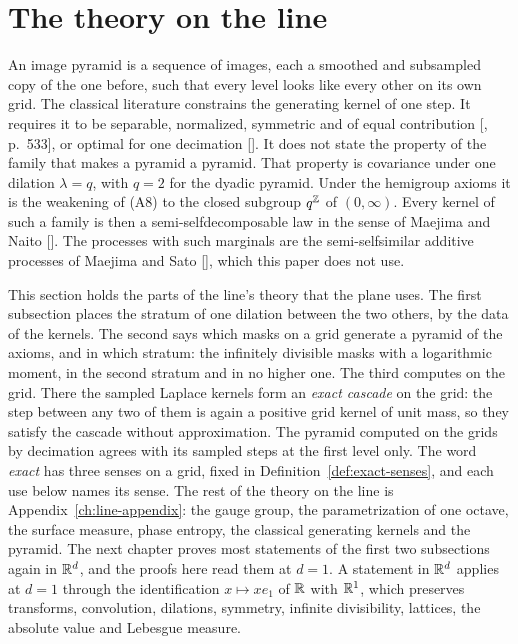 \section{The theory on the line}
\label{sec:line-theory}

An image pyramid is a sequence of images, each a smoothed and subsampled copy of the one before,
such that every level looks like every other on its own grid. The classical literature
constrains the generating kernel of one step. It requires it to be separable, normalized, symmetric
and of equal contribution [, p.~533], or optimal for one decimation
[]. It does not state the property of the family that makes a pyramid a
pyramid. That property is covariance under one dilation $\lambda = q$, with $q = 2$ for the
dyadic pyramid. Under the hemigroup axioms it is the weakening of (A8) to the closed subgroup
$q^{\mathbb{Z}}$ of $(0,\infty)$. Every kernel of such a family is then a semi-selfdecomposable law in
the sense of Maejima and Naito []. The processes with such marginals are
the semi-selfsimilar additive processes of Maejima and Sato [], which this
paper does not use.

This section holds the parts of the line's theory that the plane uses. The first subsection
places the stratum of one dilation between the two others, by the \Levy{} data of the kernels.
The second says which masks on a grid generate a pyramid of the axioms, and in which stratum:
the infinitely divisible masks with a logarithmic moment, in the second stratum and in no
higher one. The third computes on the grid. There the sampled Laplace kernels form an
\emph{exact cascade} on the grid: the step between any two of them is again a positive grid
kernel of unit mass, so they satisfy the cascade without approximation. The \Matern{} pyramid
computed on the grids by decimation agrees with its sampled steps at the first level only. The
word \emph{exact} has three senses on a grid, fixed in Definition~\ref{def:exact-senses}, and
each use below names its sense. The
rest of the theory on the line is Appendix~\ref{ch:line-appendix}: the gauge group, the
parametrization of one octave, the surface measure, phase entropy, the classical generating
kernels and the \Matern{} pyramid. The next chapter proves most statements of the first two
subsections again in $\mathbb{R}^d$, and the proofs here read them at $d = 1$. A statement in $\mathbb{R}^d$
applies at $d = 1$ through the identification $x \mapsto xe_1$ of $\mathbb{R}$ with $\mathbb{R}^1$, which
preserves transforms, convolution, dilations, symmetry, infinite divisibility, lattices, the
absolute value and Lebesgue measure.


